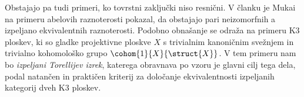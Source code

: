 Obstajajo pa tudi primeri, ko tovrstni zaključki niso resnični. V članku \cite{Mukai1981} je Mukai na primeru abelovih raznoterosti pokazal, da obstajajo pari neizomorfnih a izpeljano ekvivalentnih raznoterosti.
Podobno obnašanje se odraža na primeru K3 ploskev, ki so gladke projektivne ploskve $X$ s trivialnim kanoničnim svežnjem in trivialno kohomološko grupo $\cohom{1}{X}{\struct{X}}$. V tem primeru nam bo \emph{izpeljani Torellijev izrek}, katerega obravnava po vzoru \cite{Orlov2003} je glavni cilj tega dela, podal natančen in praktičen kriterij za določanje ekvivalentnosti izpeljanih kategorij dveh K3 ploskev.








